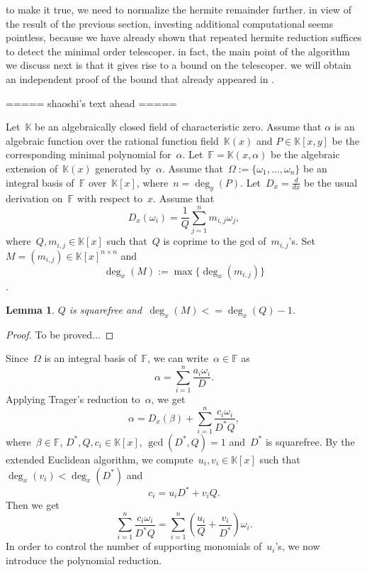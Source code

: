 \documentclass{sig-alternate}
\newtheorem{lemma}[theorem]{Lemma}
\newcommand{\red}{\color{red}}
\newcommand{\bF}{ {\mathbb F}}
\newcommand{\bK}{ {\mathbb K}}
\begin{document}
to make it true, we need to normalize the hermite remainder further. in view of the result
of the previous section, investing additional computational seems pointless, because we have
already shown that repeated hermite reduction suffices to detect the minimal order telescoper.
in fact, the main point of the algorithm we discuss next is that it gives rise to a bound on
the telescoper. we will obtain an independent proof of the bound that already appeared in \cite{GAZ}.

===== shaoshi's text ahead =====

Let~$\bK$ be an algebraically closed field of characteristic zero.
Assume that $\alpha$ is an algebraic function over the rational function
field~$\bK(x)$ and $P\in \bK[x, y]$ be the corresponding minimal polynomial for~$\alpha$.
Let~$\bF = \bK(x, \alpha)$ be the algebraic extension of~$\bK(x)$ generated by~$\alpha$.
Assume that~$\Omega:=\{\omega_1, \ldots, \omega_n\}$ be an integral basis of~$\bF$
over~$\bK[x]$, where~$n=\deg_y(P)$. Let~$D_x=\frac{d}{dx}$ be the usual derivation on~$\bF$
with respect to~$x$. Assume that
\[D_x(\omega_i) = \frac{1}{Q}\sum_{j=1}^n m_{i, j}\omega_j,\]
where~$Q, m_{i, j}\in \bK[x]$ such that~$Q$ is coprime to the gcd of~$m_{i,j}$'s. Set~$M=(m_{i, j})\in \bK[x]^{n\times n}$
and
\[\deg_x(M):= \max\{\deg_x(m_{i, j})\}\].
\begin{lemma}\label{LEM:M}
$Q$ is squarefree and~$\deg_x(M) <= \deg_x(Q)-1$.
\end{lemma}
\begin{proof}{\red To be proved...}
\end{proof}

Since~$\Omega$ is an integral basis of~$\bF$, we can write~$\alpha\in \bF$ as
\[\alpha = \sum_{i=1}^n \frac{a_i\omega_i}{D}.\]
Applying Trager's reduction to~$\alpha$, we get
\[\alpha = D_x(\beta) + \sum_{i=1}^n \frac{c_i\omega_i}{D^*Q},\]
where~$\beta\in \bF$, $D^*, Q, c_i\in \bK[x]$, $\gcd(D^*, Q)=1$ and~$D^*$ is squarefree.
By the extended Euclidean algorithm, we compute~$u_i, v_i\in \bK[x]$ such that
$\deg_x(v_i) < \deg_x(D^*)$ and
\[c_i = u_i D^* + v_i Q.\]
Then we get
\[ \sum_{i=1}^n \frac{c_i\omega_i}{D^*Q} =  \sum_{i=1}^n \left(\frac{u_i}{Q} + \frac{v_i}{D^*}\right)\omega_i.\]
In order to control the number of supporting monomials of~$u_i$'s, we now introduce the polynomial reduction.
\end{document}
